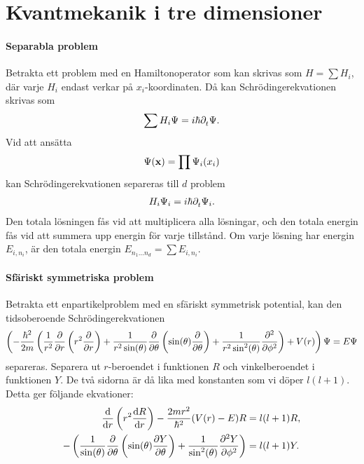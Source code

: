 \section{Kvantmekanik i tre dimensioner}

\paragraph{Separabla problem}
Betrakta ett problem med en Hamiltonoperator som kan skrivas som $H = \sum H_{i}$, där varje $H_{i}$ endast verkar på $x_{i}$-koordinaten. Då kan Schrödingerekvationen skrivas som
\begin{align*}
	\sum H_{i}\Psi = i\hbar\partial_{t}^{}\Psi.
\end{align*}
Vid att ansätta
\begin{align*}
	\Psi(\vb{x}) = \prod \Psi_{i}(x_{i})
\end{align*}
kan Schrödingerekvationen separeras till $d$ problem
\begin{align*}
	H_{i}\Psi_{i} = i\hbar\partial_{t}^{}\Psi_{i}.
\end{align*}
Den totala lösningen fås vid att multiplicera alla lösningar, och den totala energin fås vid att summera upp energin för varje tillstånd. Om varje lösning har energin $E_{i, n_{i}}$, är den totala energin $E_{n_{1}\dots n_{d}} = \sum E_{i, n_{i}}$.

\paragraph{Sfäriskt symmetriska problem}
Betrakta ett enpartikelproblem med en sfäriskt symmetrisk potential, kan den tidsoberoende Schrödingerekvationen
\begin{align*}
	\left(-\frac{\hbar^{2}}{2m}\left(\frac{1}{r^{2}}\pdv{r}\left(r^{2}\pdv{r}\right) + \frac{1}{r^{2}\sin(\theta)}\pdv{\theta}\left(\sin(\theta)\pdv{\theta}\right) + \frac{1}{r^{2}\sin^{2}(\theta)}\pdv[2]{\phi}\right) + V(r)\right)\Psi = E\Psi
\end{align*}
separeras. Separera ut $r$-beroendet i funktionen $R$ och vinkelberoendet i funktionen $Y$. De två sidorna är då lika med konstanten som vi döper $l(l + 1)$. Detta ger följande ekvationer:
\begin{align*}
	\dv{r}\left(r^{2}\dv{R}{r}\right) -\frac{2mr^{2}}{\hbar^{2}}(V(r) - E)R &= l(l + 1)R, \\
	- \left(\frac{1}{\sin(\theta)}\pdv{\theta}\left(\sin(\theta)\pdv{Y}{\theta}\right) + \frac{1}{\sin^{2}(\theta)}\pdv[2]{Y}{\phi}\right)                           &= l(l + 1)Y.
\end{align*}

